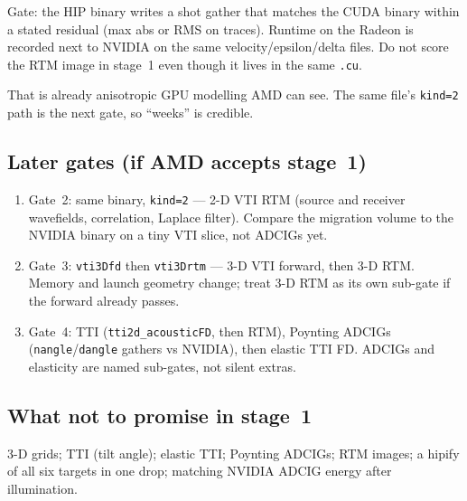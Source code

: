 \documentclass[11pt,a4paper]{article}
\begin{document}
Gate: the HIP binary writes a shot gather that matches the CUDA binary within a stated residual (max abs or RMS on traces).
Runtime on the Radeon is recorded next to NVIDIA on the same velocity/epsilon/delta files.
Do not score the RTM image in stage~1 even though it lives in the same \texttt{.cu}.

That is already anisotropic GPU modelling AMD can see.
The same file's \texttt{kind=2} path is the next gate, so ``weeks'' is credible.

\subsection*{Later gates (if AMD accepts stage~1)}

\begin{enumerate}
\item Gate~2: same binary, \texttt{kind=2} --- 2-D VTI RTM (source and receiver wavefields, correlation, Laplace filter).
Compare the migration volume to the NVIDIA binary on a tiny VTI slice, not ADCIGs yet.
\item Gate~3: \texttt{vti3Dfd} then \texttt{vti3Drtm} --- 3-D VTI forward, then 3-D RTM.
Memory and launch geometry change; treat 3-D RTM as its own sub-gate if the forward already passes.
\item Gate~4: TTI (\texttt{tti2d\_acousticFD}, then RTM), Poynting ADCIGs (\texttt{nangle}/\texttt{dangle} gathers vs NVIDIA), then elastic TTI FD.
ADCIGs and elasticity are named sub-gates, not silent extras.
\end{enumerate}

\subsection*{What not to promise in stage~1}

3-D grids; TTI (tilt angle); elastic TTI; Poynting ADCIGs; RTM images; a hipify of all six targets in one drop;
matching NVIDIA ADCIG energy after illumination.
\end{document}
